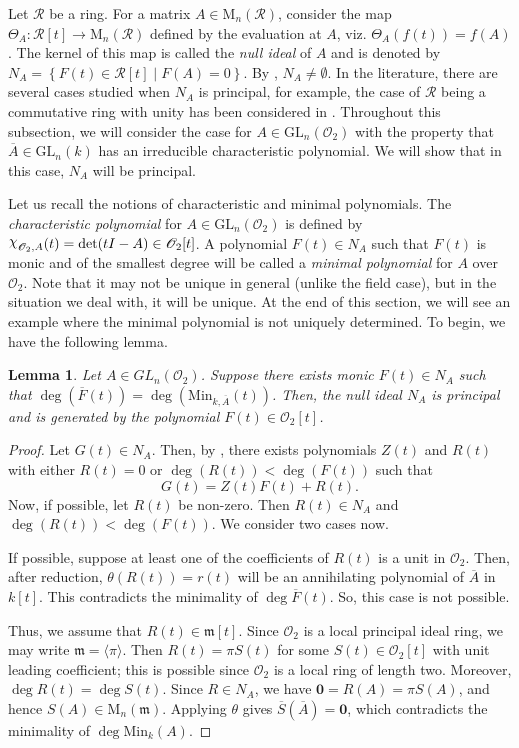 \documentclass[11pt,twoside]{amsart}
\newcommand{\GL}{\mathrm{GL}}
\newcommand{\M}{\mathrm{M}}
\newcommand{\upchi}{\raisebox{0.4ex}{$\chi$}}
\newcommand{\Char}{\upchi}
\newcommand{\R}{\mathscr{O}_2}
\newtheorem{lemma}{Lemma}[section]
\theoremstyle{definition} %
\begin{document}
Let $\mathscr{R}$ be a ring. For a matrix $A\in \M_n(\mathscr R)$, consider the map $\Theta_A\colon \mathscr R[t]\rightarrow \M_n(\mathscr R)$ defined by the evaluation at $A$, viz. $\Theta_A(f(t))= f(A)$.
The kernel of this map is called the \emph{null ideal} of $A$ and is denoted by $N_A = \left\{F(t)\in \mathscr R[t] \mid F(A) = 0\right\}$. 
By , $N_A\neq\emptyset$.
In the literature, there are several cases studied when $N_A$ is principal, for example, the case of $\mathscr R$ being a commutative ring with unity has been considered in \cite{Brown2005}. Throughout this subsection, we will consider the case for $A\in\GL_n(\R)$ with the property that $\overline{A} \in \GL_n(k)$ has an irreducible characteristic polynomial. We will show that in this case, $N_A$ will be principal. 

Let us recall the notions of characteristic and minimal polynomials.
The \emph{characteristic polynomial} for $A\in \GL_n(\R)$ is defined by $\Char_{\R,A}(t)=\det(tI-A)\in \R[t]$. 
A polynomial $F(t)\in N_A$ such that $F(t)$ is monic and of the smallest degree will be called a  \emph{minimal polynomial} for $A$ over $\R$.
Note that it may not be unique in general (unlike the field case), but in the situation we deal with, it will be unique.
At the end of this section, we will see an example where the minimal polynomial is not uniquely determined.
To begin, we have the following lemma.
\begin{lemma}\label{lem:null-ideal-prin}
Let $A\in GL_n(\R)$. Suppose there exists monic $F(t)\in N_A$ such that $\deg(\overline{F}(t))=\deg(\mathrm{Min}_{k,\overline{A}}(t))$. 
Then, the null ideal $N_A$ is principal and is generated by the polynomial $F(t)\in \R[t]$.
\end{lemma}
\begin{proof}
Let $G(t)\in N_A$. Then, by \cite[Theorem 2.14]{JacobsonAlgebraBook85}, there exists polynomials $Z(t)$ and $R(t)$ with either $R(t)=0$ or $\deg(R(t)) < \deg(F(t))$ such that $$G(t) = Z(t)F(t) + R(t).$$ 
Now, if possible, let $R(t)$ be non-zero. Then $R(t) \in N_A$ and $\deg(R(t))<\deg(F(t))$. We consider two cases now. 
        
If possible, suppose at least one of the coefficients of $R(t)$ is a unit in $\R$. Then, after reduction, $\theta(R(t)) = {r(t)}$ will be an annihilating polynomial of $\overline{A}$ in $k[t]$. This contradicts the minimality of $\deg\overline{F}(t)$.
So, this case is not possible. 
        
Thus, we assume that $R(t) \in \mathfrak{m}[t]$.  
Since $\R$ is a local principal ideal ring, we may write $\mathfrak{m} = \langle \pi \rangle$.  
Then $R(t) = \pi S(t)$ for some $S(t) \in \R[t]$ with unit leading coefficient; this is possible since $\R$ is a local ring of length two.  
Moreover, $\deg R(t) = \deg S(t)$.  
Since $R \in N_A$, we have $\mathbf{0} = R(A) = \pi S(A)$, and hence $S(A) \in \M_n(\mathfrak{m})$.  
Applying $\theta$ gives $\overline{S}(\overline{A}) = \mathbf{0}$, which contradicts the minimality of $\deg \mathrm{Min}_{k}(A)$.
\end{proof}
\end{document}
